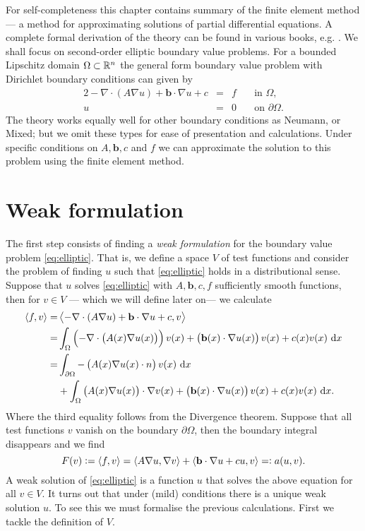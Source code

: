 \documentclass[thesis.tex]{subfiles}
\begin{document}
For self-completeness this chapter contains summary of the finite element method ---
a method for approximating solutions of partial differential equations.
A complete formal derivation of the theory can be found in various books, e.g. \cite{brenner}. 
We shall focus on second-order elliptic boundary value problems. For a bounded Lipschitz domain $\Omega \subset \mathbb{R}^n$ the 
general form boundary value problem with Dirichlet boundary conditions can given by
\begin{alignat}{2}
  -\nabla \cdot {\left(A \nabla u\right)} + \mathbf{b} \cdot \nabla u + c &= &f \quad  &\text {in } \Omega,  \label{eq:elliptic}\\
  u  &=& 0 \quad &\text{on } \partial\Omega.\nonumber
\end{alignat}
The theory works equally well for other boundary conditions as Neumann, or Mixed; but we omit
these types for ease of presentation and calculations. Under specific conditions on $A,\mathbf{b}, c$ 
and $f$ we can approximate the solution to this problem using the finite element method.

\section{Weak formulation}
The first step consists of finding a \emph{weak formulation} for the boundary value problem \eqref{eq:elliptic}. 
That is, we define a space $V$ of test functions and consider the problem of finding $u$ such that \eqref{eq:elliptic} holds 
in a distributional sense. Suppose that $u$ solves \eqref{eq:elliptic} with $A, \mathbf{b}, c, f$ sufficiently smooth functions, then for $v \in V$ --- which we will define later on--- we calculate
\begin{align*}
  \ip{f,v} = &\ip{-\nabla \cdot {\left(A \nabla u\right)} + \mathbf{b} \cdot \nabla u + c, v} \\
           = &\int_\Omega \left( -\nabla \cdot {\left(A(x) \nabla u(x)\right)}\right)v(x) + \left(\mathbf{b}(x) \cdot \nabla u(x)\right)v(x) + c(x) v(x) \, \dif x\\
           = &\int_{\partial \Omega} -\left(A(x) \nabla u(x) \cdot n\right)v(x) \, \dif x \\
              &+ \int_{\Omega} \left( A(x) \nabla u(x)\right) \cdot \nabla v(x) + \left(\mathbf{b}(x) \cdot \nabla u(x)\right)v(x) + c(x) v(x) \, \dif x.
\end{align*}
Where the third equality follows from the Divergence theorem. Suppose that all test functions $v$ vanish on the boundary $\partial \Omega$, then the boundary integral disappears and we find
\begin{equation}
  \label{eq:ellipticweak}
  F(v) := \left \langle f,v \right \rangle = \left \langle A \nabla u, \nabla v \right \rangle + \left \langle \mathbf{b} \cdot \nabla u + cu, v \right \rangle=: a(u,v).
\end{equation}
A weak solution of \eqref{eq:elliptic} is a function $u$ that solves the above equation for all $v \in V$.
It turns out that under (mild) conditions there is a unique weak solution $u$. To see this
we must formalise the previous calculations. First we tackle the definition of $V$.
\end{document}
